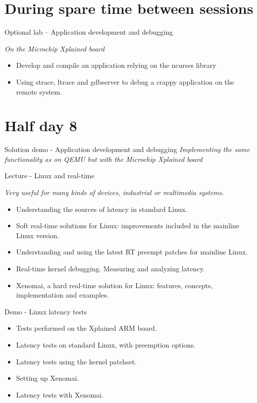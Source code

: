 \documentclass[a4paper,12pt,obeyspaces,spaces,hyphens]{article}
\begin{document}
\section{During spare time between sessions}

\feagendaonecolumn
{Optional lab – Application development and debugging}
{
  {\em On the Microchip Xplained board}
  \begin{itemize}
  \item Develop and compile an application relying on the ncurses library
  \item Using strace, ltrace and gdbserver to debug a crappy application
        on the remote system.
  \end{itemize}
}

\section{Half day 8}

\feagendaonecolumn
{Solution demo - Application development and debugging}
{
  {\em Implementing the same functionality as on QEMU but with the Microchip Xplained board}
}

\feagendaonecolumn
{Lecture - Linux and real-time}
{
  {\em Very useful for many kinds of devices, industrial or multimedia systems.}
  \begin{itemize}
  \item Understanding the sources of latency in standard Linux.
  \item Soft real-time solutions for Linux: improvements included
        in the mainline Linux version.
  \item Understanding and using the latest RT preempt patches for
        mainline Linux.
  \item Real-time kernel debugging. Measuring and analyzing latency.
  \item Xenomai, a hard real-time solution for Linux: features, concepts,
        implementation and examples.
  \end{itemize}
}

\feagendaonecolumn
{Demo - Linux latency tests}
{
  \begin{itemize}
  \item Tests performed on the Xplained ARM board.
  \item Latency tests on standard Linux, with preemption options.
  \item Latency tests using the  kernel patchset.
  \item Setting up Xenomai.
  \item Latency tests with Xenomai.
  \end{itemize}
}
\end{document}
